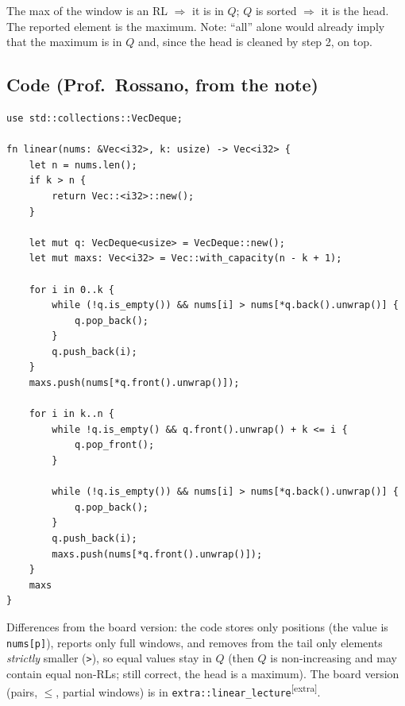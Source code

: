 \documentclass[11pt,a4paper]{article}
\theoremstyle{definition}\newtheorem*{definition}{Definition}
\newcommand{\extra}{\textsuperscript{\textcolor{warn}{[extra]}}}
\begin{document}
\begin{keybox}
The max of the window is an RL $\Rightarrow$ it is in $Q$; $Q$ is sorted $\Rightarrow$ it is the head. The reported element is the maximum.
Note: ``all'' alone would already imply that the maximum is in $Q$ and, since the head is cleaned by step 2, on top.
\end{keybox}

\subsection{Code (Prof.\ Rossano, from the note)}
\begin{lstlisting}
use std::collections::VecDeque;

fn linear(nums: &Vec<i32>, k: usize) -> Vec<i32> {
    let n = nums.len();
    if k > n {
        return Vec::<i32>::new();
    }

    let mut q: VecDeque<usize> = VecDeque::new();
    let mut maxs: Vec<i32> = Vec::with_capacity(n - k + 1);

    for i in 0..k {
        while (!q.is_empty()) && nums[i] > nums[*q.back().unwrap()] {
            q.pop_back();
        }
        q.push_back(i);
    }
    maxs.push(nums[*q.front().unwrap()]);

    for i in k..n {
        while !q.is_empty() && q.front().unwrap() + k <= i {
            q.pop_front();
        }

        while (!q.is_empty()) && nums[i] > nums[*q.back().unwrap()] {
            q.pop_back();
        }
        q.push_back(i);
        maxs.push(nums[*q.front().unwrap()]);
    }
    maxs
}
\end{lstlisting}
\noindent Differences from the board version: the code stores only positions (the value is \texttt{nums[p]}), reports only full windows,
and removes from the tail only elements \emph{strictly} smaller (\texttt{>}), so equal values stay in $Q$ (then $Q$ is non-increasing and may contain
equal non-RLs; still correct, the head is a maximum). The board version (pairs, $\le$, partial windows) is in \texttt{extra::linear\_lecture}\extra.
\end{document}
